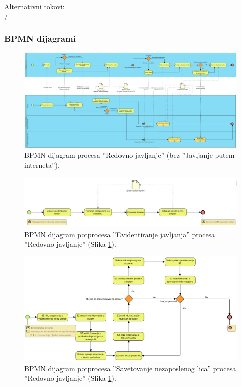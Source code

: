 \noindent Alternativni tokovi: 
\\/

\begin{mylandscape}
	\subsubsection{BPMN dijagrami}
	
	\begin{figure}[H]
		\centering
		\includegraphics[width=0.8\paperwidth]{dijagrami/bpmn-dijagrami/redovno-javljanje-bpmn.png}
		\caption{BPMN dijagram procesa ''Redovno javljanje'' (bez ''Javljanje putem interneta'').}
		\label{bpmnd: redovno javljanje}
	\end{figure}
	
	\begin{figure}[H]
		\centering
		\includegraphics[width=0.8\paperwidth]{dijagrami/bpmn-dijagrami/evidentiranje-javljanja.png}
		\caption{BPMN dijagram potprocesa ''Evidentiranje javljanja'' procesa ''Redovno javljanje'' (Slika \ref{bpmnd: redovno javljanje}).}
		
	\end{figure}
	
	\begin{figure}[H]
		\centering
		\includegraphics[width=0.8\paperwidth]{dijagrami/bpmn-dijagrami/savetovanje-nezaposlenog-lica.png}
		\caption{BPMN dijagram potprocesa ''Savetovanje nezaposlenog lica'' procesa ''Redovno javljanje'' (Slika \ref{bpmnd: redovno javljanje}).}
	\end{figure}
\end{mylandscape}